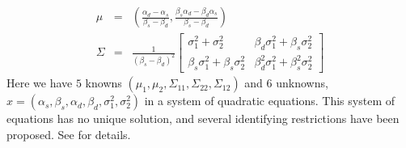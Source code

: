 \begin{eqnarray*}
\mu & = & \left(\frac{\alpha_{d}-\alpha_{s}}{\beta_{s}-\beta_{d}},\frac{\beta_{s}\alpha_{d}-\beta_{d}\alpha_{s}}{\beta_{s}-\beta_{d}}\right)\\
\Sigma & = & \frac{1}{(\beta_{s}-\beta_{d})^{2}}\left[\begin{array}{cc}
\sigma_{1}^{2}+\sigma_{2}^{2} & \beta_{d}\sigma_{1}^{2}+\beta_{s}\sigma_{2}^{2}\\
\beta_{s}\sigma_{1}^{2}+\beta_{s}\sigma_{2}^{2} & \beta_{d}^{2}\sigma_{1}^{2}+\beta_{s}^{2}\sigma_{2}^{2}
\end{array}\right]
\end{eqnarray*}
Here we have $5$ knowns $(\mu_{1},\mu_{2},\Sigma_{11},\Sigma_{22},\Sigma_{12})$
and $6$ unknowns, $x=(\alpha_{s},\beta_{s},\alpha_{d},\beta_{d},\sigma_{1}^{2},\sigma_{2}^{2})$
in a system of quadratic equations. This system of equations has no
unique solution, and several identifying restrictions have been proposed.
See \cite[Chapter 6]{Manski1999-ab} for details.